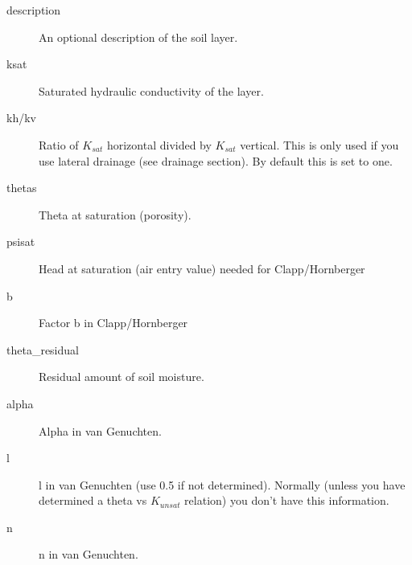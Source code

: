 \begin{description}

\item[description]
An optional description of the soil layer.

\item[ksat]
Saturated hydraulic conductivity of the layer.

\item[kh/kv]
Ratio of $K_{sat}$ horizontal divided by $K_{sat}$ vertical. This
is only used if you use lateral drainage (see drainage section).
By default this is set to one.

\item[thetas]
Theta at saturation (porosity).

\item[psisat]
Head at saturation (air entry value) needed for Clapp/Hornberger

\item[b]
Factor b in Clapp/Hornberger

\item[theta\_residual]
Residual amount of soil moisture.

\item[alpha]
Alpha in van Genuchten.

\item[l]
l in van Genuchten (use 0.5 if not determined). Normally (unless you
have determined a theta vs $K_{unsat}$ relation) you don't
have this information.

\item[n]
n in van Genuchten.


\end{description}
